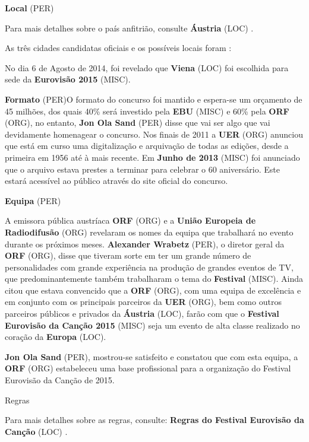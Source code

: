 \documentclass[12pt,a4paper]{article}
\begin{document}
\textbf{Local} (PER)

Para mais detalhes sobre o país anfitrião, consulte \textbf{Áustria} (LOC) .

As três cidades candidatas oficiais e os possíveis locais foram :

No dia 6 de Agosto de 2014, foi revelado que \textbf{Viena} (LOC) foi escolhida para sede da \textbf{Eurovisão 2015} (MISC).



\textbf{Formato} (PER)O formato do concurso foi mantido e espera-se um orçamento de 45 milhões, dos quais 40\% será investido pela \textbf{EBU} (MISC) e 60\% pela \textbf{ORF} (ORG), no entanto, \textbf{Jon Ola Sand} (PER) disse que vai ser algo que vai devidamente homenagear o concurso. Nos finais de 2011 a \textbf{UER} (ORG) anunciou que está em curso uma digitalização e arquivação de todas as edições, desde a primeira em 1956 até à mais recente. Em \textbf{Junho de 2013} (MISC) foi anunciado que o arquivo estava prestes a terminar para celebrar o 60 aniversário. Este estará acessível ao público através do site oficial do concurso.



\textbf{Equipa} (PER)

A emissora pública austríaca \textbf{ORF} (ORG) e a \textbf{União Europeia de Radiodifusão} (ORG) revelaram os nomes da equipa que trabalhará no evento durante os próximos meses. \textbf{Alexander Wrabetz} (PER), o diretor geral da \textbf{ORF} (ORG), disse que tiveram sorte em ter um grande número de personalidades com grande experiência na produção de grandes eventos de TV, que predominantemente também trabalharam o tema do \textbf{Festival} (MISC). Ainda citou que estava convencido que a \textbf{ORF} (ORG), com uma equipa de excelência e em conjunto com os principais parceiros da \textbf{UER} (ORG), bem como outros parceiros públicos e privados da \textbf{Áustria} (LOC), farão com que o \textbf{Festival Eurovisão da Canção 2015} (MISC) seja um evento de alta classe realizado no coração da \textbf{Europa} (LOC).

\textbf{Jon Ola Sand} (PER), mostrou-se satisfeito e constatou que com esta equipa, a \textbf{ORF} (ORG) estabeleceu uma base profissional para a organização do Festival Eurovisão da Canção de 2015.



Regras

Para mais detalhes sobre as regras, consulte: \textbf{Regras do Festival Eurovisão da Canção} (LOC) .
\end{document}
